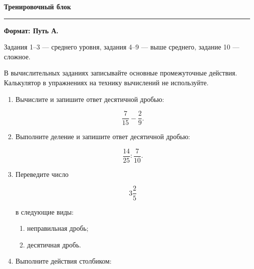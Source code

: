 \documentclass[a4paper,12pt]{article}
\newcommand{\topic}[1]{%
    \par\vspace{0.9em}%
    {\Large\bfseries\color{darkaccent}#1}\par
    \vspace{0.25em}
    \noindent
    \color{accent}\rule{\linewidth}{0.6pt}
    \color{black}
    \vspace{0.55em}
}
\begin{document}

\clearpage

\topic{Тренировочный блок}

\textbf{Формат: Путь А.}

Задания 1--3 --- среднего уровня,
задания 4--9 --- выше среднего,
задание 10 --- сложное.

В вычислительных заданиях записывайте основные промежуточные действия.
Калькулятор в упражнениях на технику вычислений не используйте.

\begin{enumerate}[label=\textbf{\arabic*.}]


    \item
    Вычислите и запишите ответ десятичной дробью:

    \[
    \frac{7}{15}-\frac{2}{9}.
    \]


    \item
    Выполните деление и запишите ответ десятичной дробью:

    \[
    \frac{14}{25}:\frac{7}{10}.
    \]


    \item
    Переведите число

    \[
    3\frac25
    \]

    в следующие виды:

    \begin{enumerate}[label=\arabic*)]
        \item неправильная дробь;
        \item десятичная дробь.
    \end{enumerate}


    \item
    Выполните действия столбиком:


\end{enumerate}
\end{document}

